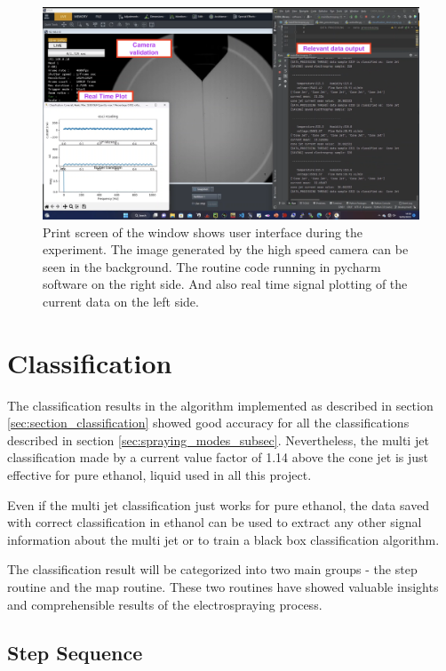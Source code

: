\begin{figure}[H]
    \center
    \includegraphics[width=16cm]{Figuras/19:03/axs1.png}
    \caption{Print screen of the window shows user interface during the experiment.
        The image generated by the high speed camera can be seen in the background.
        The routine code running in pycharm software on the right side.
        And also real time signal plotting of the current data on the left side.}
        \label{fig:multi_class_exp1}
\end{figure}


\section{Classification}
\label{sec:classification_results}

The classification results in the algorithm implemented as described in section \ref{sec:section_classification} showed good accuracy for all the classifications described in section \ref{sec:spraying_modes_subsec}.
Nevertheless, the multi jet classification made by a current value factor of 1.14 above the cone jet is just effective for pure ethanol, liquid used in all this project.

Even if the multi jet classification just works for pure ethanol, the data saved with correct classification in ethanol can be used to extract any other signal information about the multi jet or to train a black box classification algorithm.

The classification result will be categorized into two main groups - the step routine and the map routine. These two routines have showed valuable insights and comprehensible results of the electrospraying process.


\subsection{Step Sequence}
\label{subsec:step_results}


